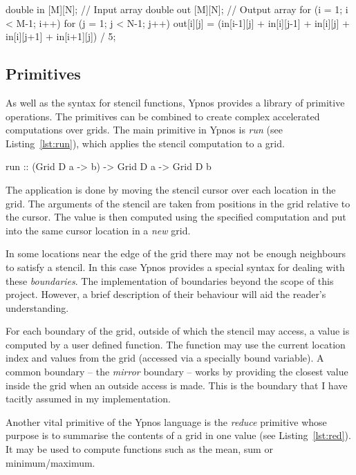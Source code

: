 \documentclass[12pt,a4paper,twoside]{scrbook}
\begin{document}
\begin{hflisting}[label=lst:avgimp, caption={An imperative implementation of the
    average function.}]
double in [M][N]; // Input array
double out [M][N]; // Output array
for (i = 1; i < M-1; i++){
  for (j = 1; j < N-1; j++){
    out[i][j] =  (in[i-1][j] +
     in[i][j-1] + in[i][j] + in[i][j+1]
                + in[i+1][j]) / 5;
  }
}
\end{hflisting}

\subsection{Primitives}

As well as the syntax for stencil functions, Ypnos provides a library of
primitive operations. The primitives can be combined to create complex
accelerated computations over grids. The main primitive in Ypnos is \emph{run}
(see Listing~\ref{lst:run}), which applies the stencil computation to a grid.

\begin{hflisting}[label={lst:run}, caption=The basic run primitive as defined in
  the original Ypnos paper\cite{ypnos-damp10}.]
run :: (Grid D a -> b) -> Grid D a -> Grid D b
\end{hflisting}

The application is done by moving the stencil cursor over each location
in the grid. The arguments of the stencil are taken from positions in
the grid relative to the cursor. The value is then computed using the
specified computation and put into the same cursor location in a
\emph{new} grid.

In some locations near the edge of the grid there may not be enough neighbours
to satisfy a stencil. In this case Ypnos provides a special syntax for dealing
with these \emph{boundaries}. The implementation of boundaries beyond the scope
of this project. However, a brief description of their behaviour will aid the
reader's understanding.

For each boundary of the grid, outside of which the stencil may access, a value
is computed by a user defined function. The function may use the current
location index and values from the grid (accessed via a specially bound
variable). A common boundary -- the \emph{mirror} boundary -- works by providing
the closest value inside the grid when an outside access is made. This is the
boundary that I have tacitly assumed in my implementation.

Another vital primitive of the Ypnos language is the \emph{reduce} primitive
whose purpose is to summarise the contents of a grid in one value (see
Listing~\ref{lst:red}). It may be used to compute functions such as the mean,
sum or minimum/maximum.
\end{document}
